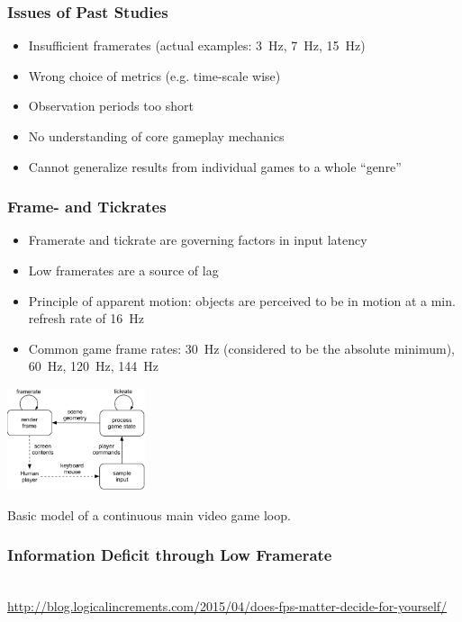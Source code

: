 \documentclass{UDEbeamerEN}
\begin{document}
\begin{frame}
	\frametitle{Issues of Past Studies}

	\begin{itemize}
		\item Insufficient framerates (actual examples: \SI{3}{\hertz}, \SI{7}{\hertz}, \SI{15}{\hertz})
		\item Wrong choice of metrics (e.g. time-scale wise)
		\item Observation periods too short
		\item No understanding of core gameplay mechanics
		\item Cannot generalize results from individual games to a whole ``genre''
	\end{itemize}
\end{frame}


\begin{frame}
	\frametitle{Frame- and Tickrates}

	\begin{itemize}
		\item Framerate and tickrate are governing factors in input latency
		\item Low framerates are a source of lag
		\item Principle of apparent motion: objects are perceived to be in motion at a min. refresh rate of \SI{16}{\hertz}
		\item Common game frame rates: \SI{30}{\hertz} (considered to be the absolute minimum), \SI{60}{\hertz}, \SI{120}{\hertz}, \SI{144}{\hertz}
	\end{itemize}

	\begin{center}
		\includegraphics[height=3cm]{../../../models/game_loop.pdf}

		Basic model of a continuous main video game loop.
	\end{center}

\end{frame}


\begin{frame}
	\frametitle{Information Deficit through Low Framerate}

	\begin{center}
		\\
		{\tiny\url{http://blog.logicalincrements.com/2015/04/does-fps-matter-decide-for-yourself/}}
	\end{center}
\end{frame}
\end{document}
